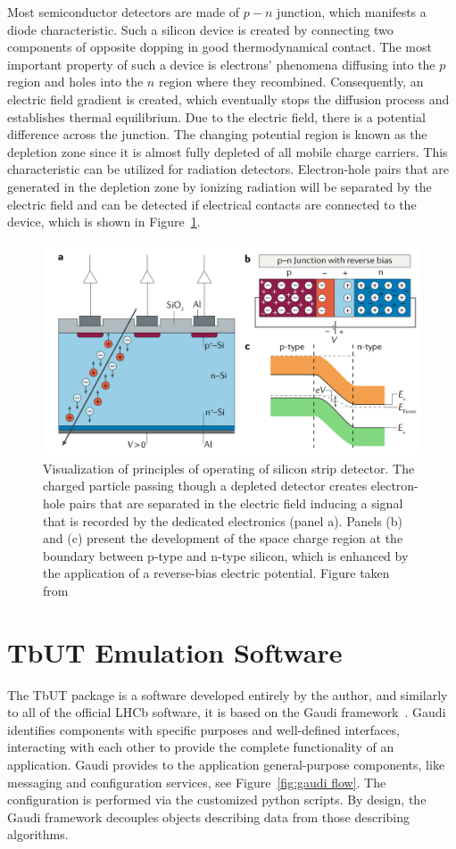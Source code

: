 Most semiconductor detectors are made of $p-n$ junction, which manifests a diode characteristic. Such a silicon device is created by connecting two components of opposite dopping in good thermodynamical contact. The most important property of such a device is electrons' phenomena diffusing into the $p$ region and holes into the $n$ region where they recombined. Consequently, an electric field gradient is created, which eventually stops the diffusion process and establishes thermal equilibrium. Due to the electric field, there is a potential difference across the junction. The changing potential region is known as the depletion zone since it is almost fully depleted of all mobile charge carriers. This characteristic can be utilized for radiation detectors. Electron-hole pairs that are generated in the depletion zone by ionizing radiation will be separated by the electric field and can be detected if electrical contacts are connected to the device, which is shown in Figure~\ref{fig:silicon_det}.

\begin{figure}[h]
\centering
\includegraphics{figures/silicon_detector.png}
\caption{Visualization of principles of operating of silicon strip detector. The charged particle passing though a depleted detector creates electron-hole pairs that are separated in the electric field inducing a signal that is recorded by the dedicated electronics (panel a). Panels (b) and (c) present the development of the space charge region at the boundary between p-type and n-type silicon, which is enhanced by the application of a reverse-bias electric potential. Figure taken from~\cite{silicon_nature}}
\label{fig:silicon_det}
\end{figure}

\section{TbUT Emulation Software}
The TbUT package is a software developed entirely by the author, and similarly to all of the official LHCb software, it is based on the Gaudi framework~\cite{gaudi}. Gaudi identifies components with specific purposes and well-defined interfaces, interacting with each other to provide the complete functionality of an application. Gaudi provides to the application general-purpose components, like messaging and configuration services, see Figure~\ref{fig:gaudi flow}. The configuration is performed via the customized python scripts. By design, the Gaudi framework decouples objects describing data from those describing algorithms.

